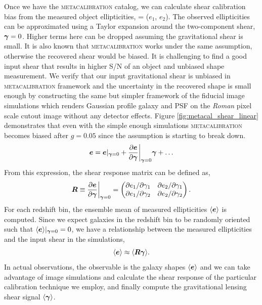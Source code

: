 \documentclass[fleqn,usenatbib]{mnras}
\begin{document}
Once we have the \textsc{metacalibration} catalog, we can calculate shear calibration bias from the measured object ellipticities,  = ($e_{1}$, $e_{2}$). The observed ellipticities can be approximated using a Taylor expansion around the two-component shear, $\vb*{\gamma}=0$. Higher terms here can be dropped assuming the gravitational shear is small. It is also known that \textsc{metacalibration} works under the same assumption, otherwise the recovered shear would be biased. It is challenging to find a good input shear that results in higher S/N of an object and unbiased shape measurement. We verify that our input gravitational shear is unbiased in \textsc{metacalibration} framework and the uncertainty in the recovered shape is small enough by constructing the same but simpler framework of the fiducial image simulations which renders Gaussian profile galaxy and PSF on the \emph{Roman} pixel scale cutout image without any detector effects. Figure \ref{fig:metacal_shear_linear} demonstrates that even with the simple enough simulations \textsc{metacalibration} becomes biased after $g=0.05$ since the assumption is starting to break down. 
\begin{equation}
    \vb*{e} = \vb*{e}\rvert_{\vb*{\gamma}=0} + \frac{\partial \vb*{e}}{\partial \vb*{\gamma}}\bigg\rvert_{\vb*{\gamma}=0}\vb*{\gamma} + \ldots
\end{equation}
From this expression, the shear response matrix can be defined as, 
\begin{equation}
    \vb*{R} \equiv \frac{\partial \vb*{e}}{\partial \vb*{\gamma}}\bigg\rvert_{\vb*{\gamma}=0} = 
    \begin{pmatrix}
        \partial e_{1}/\partial \gamma_{1} & \partial e_{2}/\partial \gamma_{1} \\ 
        \partial e_{1}/\partial \gamma_{2} & \partial e_{2}/\partial \gamma_{2}
    \end{pmatrix}. 
\end{equation}
For each redshift bin, the ensemble mean of measured ellipticities $\langle\vb*{e}\rangle$ is computed. Since we expect galaxies in the redshift bin to be randomly oriented such that $\langle\vb*{e}\rangle\rvert_{\vb*{\gamma}=0}=0$, we have a relationship between the measured ellipticities and the input shear in the simulations, 
\begin{equation}
    \langle\vb*{e}\rangle \approx \langle \vb*{R}\vb*{\gamma} \rangle. 
\end{equation} 
In actual observations, the observable is the galaxy shapes $\langle\vb*{e}\rangle$ and we can take advantage of image simulations and calculate the shear response of the particular calibration technique we employ, and finally compute the gravitational lensing shear signal $\langle\vb*{\gamma}\rangle$. 
\end{document}
